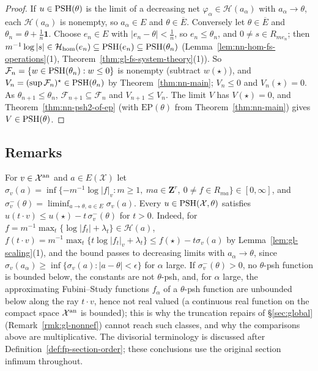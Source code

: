 \begin{proof}
If $u\in\operatorname{PSH}(\theta)$ is the limit of a decreasing net $\varphi_\alpha\in\mathcal H(a_\alpha)$ with $a_\alpha\to\theta$, each $\mathcal H(a_\alpha)$ is nonempty, so
$a_\alpha\in E$ and $\theta\in\overline E$. Conversely let $\theta\in\overline E$ and $\theta_n=\theta+\frac1n\mathbf1$. Choose $e_n\in E$ with $|e_n-\theta|<\frac1n$, so
$e_n\le\theta_n$, and $0\ne s\in R_{me_n}$; then $m^{-1}\log|s|\in\mathcal H_{\mathrm{hom}}(e_n)\subseteq\operatorname{PSH}(e_n)\subseteq\operatorname{PSH}(\theta_n)$ (Lemma~\ref{lem:nn-hom-fs-operations}(1), Theorem~\ref{thm:gl-fs-system-theory}(1)). So
$\mathcal F_n=\{w\in\operatorname{PSH}(\theta_n):w\le0\}$ is nonempty (subtract $w(\star)$), and $V_n=(\sup\mathcal F_n)^\star\in\operatorname{PSH}(\theta_n)$ by Theorem~\ref{thm:nn-main}; $V_n\le0$ and
$V_n(\star)=0$. As $\theta_{n+1}\le\theta_n$, $\mathcal F_{n+1}\subseteq\mathcal F_n$ and $V_{n+1}\le V_n$. The limit $V$ has $V(\star)=0$, and
Theorem~\ref{thm:nn-psh2-of-ep} (with $\mathrm{EP}(\theta)$ from Theorem~\ref{thm:nn-main}) gives $V\in\operatorname{PSH}(\theta)$.
\end{proof}

\subsection{Remarks}\label{subsec:nn-remarks}

\begin{remark}\label{rmk:nn-negative-part}
\leanok
{}
For $v\in\mathcal X^{\mathrm{an}}$ and $a\in E(\mathcal X)$ let $\sigma_v(a)=\inf\{-m^{-1}\log|f|_v:m\ge1,\ ma\in\mathbf Z^r,\ 0\ne f\in R_{ma}\}\in[0,\infty]$, and
$\sigma^-_v(\theta)=\liminf_{a\to\theta,\,a\in E}\sigma_v(a)$. Every $u\in\operatorname{PSH}(\mathcal X,\theta)$ satisfies $u(t\cdot v)\le u(\star)-t\,\sigma^-_v(\theta)$ for $t>0$. Indeed, for
$f=m^{-1}\max_t\{\log|f_t|+\lambda_t\}\in\mathcal H(a)$, $f(t\cdot v)=m^{-1}\max_t\{t\log|f_t|_v+\lambda_t\}\le f(\star)-t\sigma_v(a)$ by Lemma~\ref{lem:gl-scaling}(1), and the
bound passes to decreasing limits with $a_\alpha\to\theta$, since $\sigma_v(a_\alpha)\ge\inf\{\sigma_v(a):|a-\theta|<\epsilon\}$ for $\alpha$ large. If $\sigma^-_v(\theta)>0$, no
$\theta$-psh function is bounded below, the constants are not $\theta$-psh, and, for $\alpha$ large, the approximating Fubini--Study functions $f_\alpha$ of a $\theta$-psh
function are unbounded below along the ray $t\cdot v$, hence not real valued (a continuous real function on the compact space $\mathcal X^{\mathrm{an}}$ is bounded); this is why the truncation repairs of \S\ref{sec:global}
(Remark~\ref{rmk:gl-nonnef}) cannot reach such classes, and why the comparisons above are multiplicative. The divisorial terminology is discussed after Definition~\ref{def:fp-section-order}; these conclusions use the original section infimum throughout.
\end{remark}

